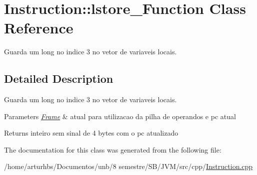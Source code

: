 \hypertarget{classInstruction_1_1lstore__3Function}{}\section{Instruction\+:\+:lstore\+\_\+Function Class Reference}
\label{classInstruction_1_1lstore__3Function}


Guarda um long no indice 3 no vetor de variaveis locais.  




\subsection{Detailed Description}
Guarda um long no indice 3 no vetor de variaveis locais. 


\begin{DoxyParams}{Parameters}
{\em \hyperlink{classFrame}{Frame}} & atual para utilizacao da pilha de operandos e pc atual \\
\hline
\end{DoxyParams}
\begin{DoxyReturn}{Returns}
inteiro sem sinal de 4 bytes com o pc atualizado 
\end{DoxyReturn}


The documentation for this class was generated from the following file\+:\begin{DoxyCompactItemize}
\item 
/home/arturhbs/\+Documentos/unb/8 semestre/\+S\+B/\+J\+V\+M/src/cpp/\hyperlink{Instruction_8cpp}{Instruction.\+cpp}\end{DoxyCompactItemize}
